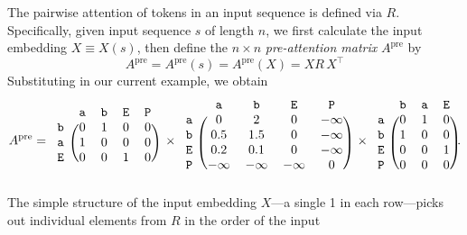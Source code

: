 \documentclass{article}
\newcommand{\ta}{\mathtt{a}}
\newcommand{\tb}{\mathtt{b}}
\newcommand{\tE}{\mathtt{E}}
\newcommand{\tP}{\mathtt{P}}
\newcommand{\Tr}{^{\top}} %
\newcommand{\by}{\times}
\begin{document}
The pairwise attention of tokens in an input sequence is defined via
$R$. Specifically, given input sequence $s$ of length $n$, we first
calculate the input embedding $X\equiv X(s)$, then define the
$n \by n$ \emph{pre-attention matrix} $A^\text{pre}$ by
\begin{displaymath}
  A^\text{pre} = A^\text{pre}(s) = A^\text{pre}(X) = X R\, X\Tr
\end{displaymath}
Substituting in our current example, we obtain
{\footnotesize
  \begin{multline*}
    A^\text{pre} =
\begin{blockarray}{ccccc}
       & \ta & \tb & \tE & \tP  \\
      \begin{block}{c(cccc)}
        \tb & 0 & 1 & 0 & 0 \\
        \ta & 1 & 0 & 0 & 0 \\
        \tE & 0 & 0 & 1 & 0 \\
      \end{block}
    \end{blockarray}
   \,\,\times
    \begin{blockarray}{ccccc}
       & \ta & \tb & \tE & \tP  \\
      \begin{block}{c(cccc)}
        \ta & 0 & 2 & 0 & -\infty \\
        \tb & 0.5 & 1.5 & 0 & -\infty \\
        \tE & 0.2 & 0.1 & 0 & -\infty \\
        \tP & -\infty & -\infty & -\infty & 0 \\
      \end{block}
    \end{blockarray}    
    \,\,\times
\begin{blockarray}{cccc}
       & \tb & \ta & \tE   \\
      \begin{block}{c(ccc)}
        \ta & 0 & 1 & 0  \\
        \tb & 1 & 0 & 0  \\
        \tE & 0 & 0 & 1  \\
        \tP & 0 & 0 & 0  \\
      \end{block}
\end{blockarray}.
\end{multline*}
}
The simple structure of the input embedding $X$---a single 1 in each
row---picks out individual elements from $R$ in the order of the input
\end{document}
